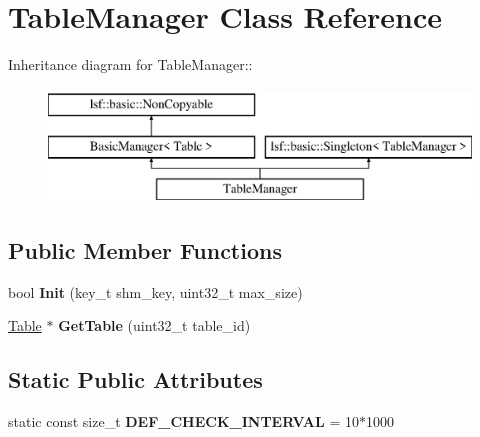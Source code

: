 \hypertarget{classTableManager}{
\section{TableManager Class Reference}
\label{classTableManager}
}
Inheritance diagram for TableManager::\begin{figure}[H]
\begin{center}
\leavevmode
\includegraphics[height=3cm]{classTableManager}
\end{center}
\end{figure}
\subsection*{Public Member Functions}
\begin{DoxyCompactItemize}
\item 
\hypertarget{classTableManager_aeb010ac15d6a77c83b628672daad8a07}{
bool {\bfseries Init} (key\_\-t shm\_\-key, uint32\_\-t max\_\-size)}
\label{classTableManager_aeb010ac15d6a77c83b628672daad8a07}

\item 
\hypertarget{classTableManager_a82a19594b66b1110e213e241cbcb8c58}{
\hyperlink{classTable}{Table} $\ast$ {\bfseries GetTable} (uint32\_\-t table\_\-id)}
\label{classTableManager_a82a19594b66b1110e213e241cbcb8c58}

\end{DoxyCompactItemize}
\subsection*{Static Public Attributes}
\begin{DoxyCompactItemize}
\item 
\hypertarget{classTableManager_a0374c7fca3da6a0f5c98eeee433b6e8d}{
static const size\_\-t {\bfseries DEF\_\-CHECK\_\-INTERVAL} = 10$\ast$1000}
\label{classTableManager_a0374c7fca3da6a0f5c98eeee433b6e8d}

\end{DoxyCompactItemize}
